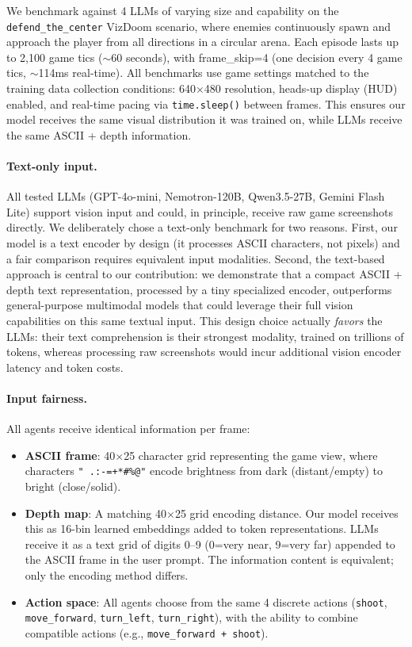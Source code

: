 \documentclass[11pt,a4paper]{article}
\begin{document}
We benchmark against 4 LLMs of varying size and capability on the \texttt{defend\_the\_center} VizDoom scenario, where enemies continuously spawn and approach the player from all directions in a circular arena. Each episode lasts up to 2,100 game tics (${\sim}$60 seconds), with frame\_skip=4 (one decision every 4 game tics, ${\sim}$114ms real-time). All benchmarks use game settings matched to the training data collection conditions: 640$\times$480 resolution, heads-up display (HUD) enabled, and real-time pacing via \texttt{time.sleep()} between frames. This ensures our model receives the same visual distribution it was trained on, while LLMs receive the same ASCII + depth information.

\paragraph{Text-only input.} All tested LLMs (GPT-4o-mini, Nemotron-120B, Qwen3.5-27B, Gemini Flash Lite) support vision input and could, in principle, receive raw game screenshots directly. We deliberately chose a text-only benchmark for two reasons. First, our model is a text encoder by design (it processes ASCII characters, not pixels) and a fair comparison requires equivalent input modalities. Second, the text-based approach is central to our contribution: we demonstrate that a compact ASCII + depth text representation, processed by a tiny specialized encoder, outperforms general-purpose multimodal models that could leverage their full vision capabilities on this same textual input. This design choice actually \textit{favors} the LLMs: their text comprehension is their strongest modality, trained on trillions of tokens, whereas processing raw screenshots would incur additional vision encoder latency and token costs.

\paragraph{Input fairness.} All agents receive identical information per frame:

\begin{itemize}
    \item \textbf{ASCII frame}: 40$\times$25 character grid representing the game view, where characters \texttt{" .:-=+*\#\%@"} encode brightness from dark (distant/empty) to bright (close/solid).
    \item \textbf{Depth map}: A matching 40$\times$25 grid encoding distance. Our model receives this as 16-bin learned embeddings added to token representations. LLMs receive it as a text grid of digits 0--9 (0=very near, 9=very far) appended to the ASCII frame in the user prompt. The information content is equivalent; only the encoding method differs.
    \item \textbf{Action space}: All agents choose from the same 4 discrete actions (\texttt{shoot}, \texttt{move\_forward}, \texttt{turn\_left}, \texttt{turn\_right}), with the ability to combine compatible actions (e.g., \texttt{move\_forward + shoot}).
\end{itemize}
\end{document}
